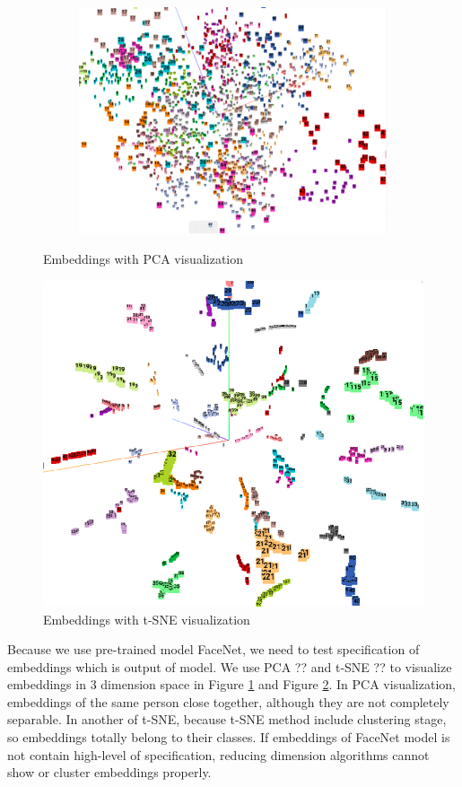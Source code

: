 \documentclass[journal, twocolumn]{IEEEtran}
\begin{document}
\begin{figure}[h!]
\begin{subfigure}[b]{0.5\linewidth}
    \includegraphics[width=\linewidth]{img/pca3.png}
    \caption{}
  \end{subfigure}
  \caption{Embeddings with PCA visualization} 
  \label{fig:pca}
\end{figure}

\begin{figure}
    \centering
    \includegraphics[width=0.7\linewidth]{img/t-sne.png}
	\caption{Embeddings with t-SNE visualization}\label{fig:t-sne}
\end{figure}
Because we use pre-trained model FaceNet, we need to test specification of embeddings which is output of model. We use PCA ?? and t-SNE ?? to visualize embeddings in 3 dimension space in Figure \ref{fig:pca} and Figure \ref{fig:t-sne}. In PCA visualization, embeddings of the same person close together, although they are not completely separable. In another of t-SNE, because t-SNE method include clustering stage, so embeddings totally belong to their classes. If embeddings of FaceNet model is not contain high-level of specification, reducing dimension algorithms cannot show or cluster embeddings properly.  
\end{document}
